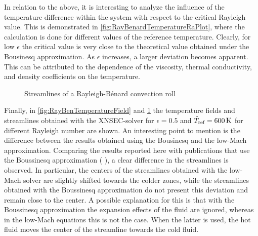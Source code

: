 In relation to the above, it is interesting to analyze the influence of the temperature difference within the system with respect to the critical Rayleigh value. This is demonstrated in \cref{fig:RayBenardTemperatureRaPlot}, where the calculation is done for different values of the reference temperature. Clearly, for low $\epsilon$  the critical value is very close to the theoretical value obtained under the Bousinesq approximation. As $\epsilon$ increases, a larger deviation becomes apparent. This can be attributed to the dependence of the viscosity, thermal conductivity, and density coefficients on the temperature. 


\begin{figure}[tb]
	\centering
	\pgfplotsset{width=0.31\textwidth, compat=1.3}
	\par\bigskip
	\caption{Streamlines of a Rayleigh-Bénard convection roll} \label{fig:RayBenStreamlines}
\end{figure}
Finally, in \cref{fig:RayBenTemperatureField} and \cref{fig:RayBenStreamlines} the temperature fields and streamlines obtained with the XNSEC-solver for $\epsilon = 0.5$ and $\hat T_{\text{ref}} = \SI{600}{\kelvin}$ for different Rayleigh number are shown. An interesting point to mention is the difference between the results obtained using the Bousinesq and the low-Mach approximation. Comparing the results reported here with publications that use the Boussinesq approximation ( \cite{shishkinaRayleighBenardConvectionContainer2021,zhouNumericalSimulationLaminar2004}), a clear difference in the streamlines is observed. In particular, the centers of the streamlines obtained with the low-Mach solver are slightly shifted towards the colder zones, while the streamlines obtained with the Boussinesq approximation do not present this deviation and remain close to the center. A possible explanation for this is that with the Boussinesq approximation the expansion effects of the fluid are ignored, whereas in the low-Mach equations this is not the case. When the latter is used, the hot fluid moves the center of the streamline towards the cold fluid.
\FloatBarrier

